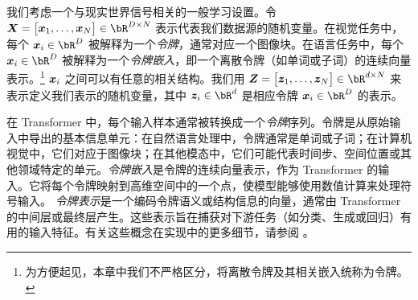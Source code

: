 \documentclass[../../book-main_zh.tex]{subfiles}
\begin{document}
我们考虑一个与现实世界信号相关的一般学习设置。令 \(\X = \mat{\x_{1}, \dots, \x_{N}} \in \bR^{D \times N}\) 表示代表我们数据源的随机变量。在视觉任务中，每个 \(\x_{i} \in \bR^{D}\) 被解释为一个\textit{令牌}，通常对应一个图像块。在语言任务中，每个 \(\x_{i} \in \bR^{D}\) 被解释为一个\textit{令牌嵌入}，即一个离散令牌（如单词或子词）的连续向量表示。\footnote{为方便起见，本章中我们不严格区分，将离散令牌及其相关嵌入统称为令牌。} %
\(\bm{x}_{i}\) 之间可以有任意的相关结构。我们用 \(\Z = \mat{\z_{1}, \dots, \z_{N}} \in \bR^{d \times N}\) 来表示定义我们表示的随机变量，其中 \(\z_{i} \in \bR^{d}\) 是相应令牌 \(\x_i \in \bR^{D}\) 的表示。%

\begin{remark}
    在 Transformer 中，每个输入样本通常被转换成一个{\em 令牌}序列。令牌是从原始输入中导出的基本信息单元：在自然语言处理中，令牌通常是单词或子词；在计算机视觉中，它们对应于图像块；在其他模态中，它们可能代表时间步、空间位置或其他领域特定的单元。{\em 令牌嵌入}是令牌的连续向量表示，作为 Transformer 的输入。它将每个令牌映射到高维空间中的一个点，使模型能够使用数值计算来处理符号输入。
    {\em 令牌表示}是一个编码令牌语义或结构信息的向量，通常由 Transformer 的中间层或最终层产生。这些表示旨在捕获对下游任务（如分类、生成或回归）有用的输入特征。有关这些概念在实现中的更多细节，请参阅 。
\end{remark}


\end{document}
